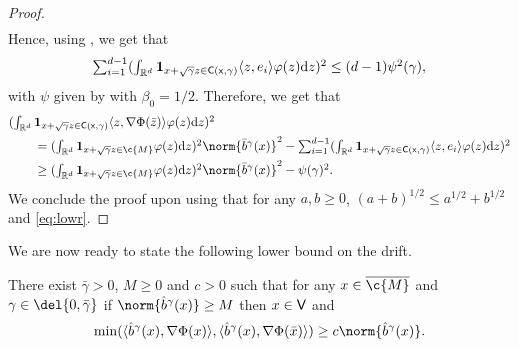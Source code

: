 \begin{proof}
\begin{align}
	\end{align}
	Hence, using , we get that \begin{equation} \textstyle{\sum_{i=1}^{d-1}( \int_{\mathbb{R}^d} \bm{1}_{x + \sqrt{\gamma}z \in \sf{C}(x,\gamma)} \langle z, e_i \rangle \varphi(z) \mathrm{d} z)^2} \leq (d-1) \psi^2(\gamma) , \end{equation} with $\psi$ given by  with $\beta_0=1/2$.
	Therefore, we get that \begin{align}  & \textstyle{(\int_{\R^d} \bm{1}_{x + \sqrt{\gamma}z \in \sf{C}(x,\gamma)} \langle z, \nabla \Phi(\bar{z}) \rangle \varphi(z) \mathrm{d} z)^2} \\ &\qquad = \textstyle (\int_{\R^d} \bm{1}_{x + \sqrt{\gamma} z \in \c{M}} \varphi(z) \mathrm{d} z)^2 \textstyle{\norm{\bar{b}^\gamma(x)}^2 - \sum_{i=1}^{d-1}( \int_{\R^d} \bm{1}_{x + \sqrt{\gamma}z \in \sf{C}(x,\gamma)} \langle z, e_i \rangle \varphi(z) \mathrm{d} z)^2} \\ &\qquad \geq \textstyle (\int_{\R^d} \bm{1}_{x + \sqrt{\gamma} z \in \c{M}} \varphi(z) \mathrm{d} z)^2 \norm{\bar{b}^\gamma(x)}^2 - \psi(\gamma)^2.
	\end{align}
	We conclude the proof upon using that for any $a,b \geq 0$, $(a+b)^{1/2} \leq a^{1/2} + b^{1/2}$ and \eqref{eq:lowr}.
\end{proof}

We are now ready to state the following lower bound on the drift.

\begin{proposition}
	\label{prop:lower-bound-drift}
	There exist $\bar{\gamma} >0$, $M \geq 0$ and $c >0$ such that for any $x \in \cl{\c{M}}$ and $\gamma \in \del{0, \bar{\gamma}}$ if $\norm{\hat{b}^\gamma(x)} \geq M$ then $x \in \sf{V}$ and \begin{equation} \min(\langle \hat{b}^\gamma(x), \nabla \Phi(x) \rangle, \langle \hat{b}^\gamma(x), \nabla \Phi(\bar{x}) \rangle) \geq c \norm{\hat{b}^\gamma(x)} .
	\end{equation}
\end{proposition}


